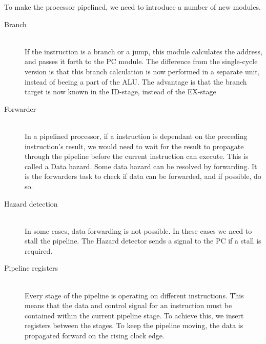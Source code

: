 To make the processor pipelined, we need to introduce a number of new modules.

\begin{description}
  \item[Branch] \hfill \\
  If the instruction is a branch or a jump, this module calculates the address, and passes it forth to the PC module. The difference from the single-cycle version is that this  branch calculation is now performed in a separate unit, instead of beeing a part of the ALU. The advantage is that the branch target is now known in the ID-stage, instead of the EX-stage 
  \item[Forwarder] \hfill \\
  In a pipelined processor, if a instruction is dependant on the preceding instruction's result, we would need to wait for the result to propagate through the pipeline before the current instruction can execute. This is called a Data hazard. Some data hazard can be resolved by forwarding. It is the forwarders task to check if data can be forwarded, and if possible, do so.
  \item[Hazard detection] \hfill \\
  In some cases, data forwarding is not possible. In these cases we need to stall the pipeline. The Hazard detector sends a signal to the PC if a stall is required.
  \item[Pipeline registers] \hfill \\
  Every stage of the pipeline is operating on different instructions. This means that the data and control signal for an instruction must be contained within the current pipeline stage. To achieve this, we insert registers between the stages. To keep the pipeline moving, the data is propagated forward on the rising clock edge. 
\end{description}
